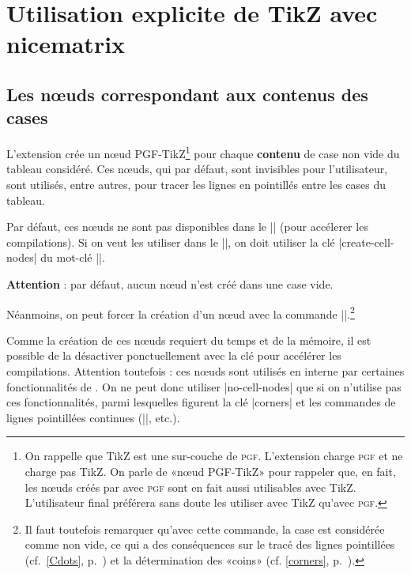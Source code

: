 \documentclass[dvipsnames]{article}
\begin{document}
\section{Utilisation explicite de TikZ avec nicematrix}

\label{name}
\label{PGF-nodes}

\subsection{Les nœuds correspondant aux contenus des cases}

\label{no-cell-nodes}

L'extension  crée un nœud PGF-TikZ\footnote{On rappelle que TikZ
  est une sur-couche de \textsc{pgf}. L'extension  charge
  \textsc{pgf} et ne charge pas TikZ. On parle de «nœud PGF-TikZ» pour rappeler
  que, en fait, les nœuds créés par  avec \textsc{pgf} sont en
  fait aussi utilisables avec TikZ. L'utilisateur final préférera sans doute les
  utiliser avec TikZ qu'avec \textsc{pgf}.} pour chaque \textbf{contenu} de case
non vide du tableau considéré. Ces nœuds, qui par défaut, sont invisibles pour
l'utilisateur, sont utilisés, entre autres, pour tracer les lignes en pointillés
entre les cases du tableau.

\smallskip
Par défaut, ces nœuds ne sont pas disponibles dans le |\CodeBefore| (pour accélerer
les compilations). Si on veut les utiliser dans le |\CodeBefore|, on doit utiliser la
clé |create-cell-nodes| du mot-clé |\CodeBefore|.

\smallskip
\textbf{Attention} : par défaut, aucun nœud n'est créé dans une case vide.

\smallskip
Néanmoins, on peut forcer la création d'un nœud avec la commande
|\NotEmpty|.\footnote{Il faut toutefois remarquer qu'avec cette commande, la
  case est considérée comme non vide, ce qui a des conséquences sur le tracé des
  lignes pointillées (cf.~\ref{Cdots}, p.~\pageref{Cdots}) et la détermination
  des «coins» (cf. \ref{corners}, p.~\pageref{corners}).}

\medskip
Comme la création de ces nœuds requiert du temps et de la mémoire, il est
possible de la désactiver ponctuellement avec la clé 
pour accélérer les compilations. Attention toutefois : ces nœuds sont utilisés
en interne par certaines fonctionnalités de . On ne peut donc
utiliser |no-cell-nodes| que si on n'utilise pas ces fonctionnalités, parmi
lesquelles figurent la clé |corners| et les commandes de lignes pointillées
continues (|\Cdots|, etc.).
\end{document}
